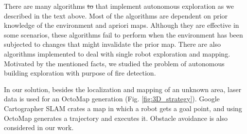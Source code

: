 There are many algorithms \st{to} {\color{red}that} implement autonomous exploration as we described in the text above. Most of the algorithms are dependent on prior knowledge of the environment and apriori maps. Although they are effective in some scenarios, these algorithms fail to perform when the environment has been subjected to changes that might invalidate the prior map. There are also algorithms implemented to deal with single robot exploration and mapping. Motivated by the mentioned facts, we studied the problem of autonomous building exploration with purpose of fire detection. 

{\color{red}In our solution,} besides the localization and mapping of an unknown area, laser data is used for an OctoMap generation (Fig. \ref{fig:3D_strategy}). Google Cartographer SLAM crates a map in which a robot gets a goal point, and using OctoMap generates a trajectory and executes it. Obstacle avoidance is also considered in our work.